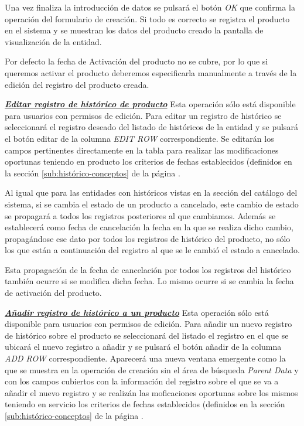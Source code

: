 Una vez finaliza la introducción de datos se pulsará el botón \emph{OK} que confirma la operación del formulario de creación. Si todo es correcto se registra el producto en el sistema y se muestran los datos del producto creado la pantalla de visualización de la entidad.

Por defecto la fecha de Activación del producto no se cubre, por lo que si queremos activar el producto deberemos especificarla manualmente a través de la edición del registro del producto creada.


\underline{\textsl{\textbf{Editar registro de histórico de producto}}}\newline
Esta operación sólo está disponible para usuarios con permisos de edición.
Para editar un registro de histórico se seleccionará el registro deseado del listado de históricos de la entidad y se pulsará el botón editar de la columna \textit{EDIT ROW} correspondiente. Se editarán los campos pertinentes directamente en la tabla para realizar las modificaciones oportunas teniendo en producto los criterios de fechas establecidos (definidos en la sección \ref{sub:histórico-conceptos} de la página \pageref{sub:histórico-conceptos}.

Al igual que para las entidades con históricos vistas en la sección del catálogo del sistema, si se cambia el estado de un producto a cancelado, este cambio de estado se propagará a todos los registros posteriores al que cambiamos. Además se establecerá como fecha de cancelación la fecha en la que se realiza dicho cambio, propagándose ese dato por todos los registros de histórico del producto, no sólo los que están a continuación del registro al que se le cambió el estado a cancelado.

Esta propagación de la fecha de cancelación por todos los registros del histórico  también ocurre si se modifica dicha fecha. Lo mismo ocurre si se cambia la fecha de activación del producto.

\underline{\textsl{\textbf{Añadir registro de histórico a un producto}}}\newline
Esta operación sólo está disponible para usuarios con permisos de edición.
Para añadir un nuevo registro de histórico sobre el producto se seleccionará del listado el registro en el que se ubicará el nuevo registro a añadir y se pulsará el botón añadir de la columna \textit{ADD ROW} correspondiente. Aparecerá una nueva ventana emergente como la que se muestra en la operación de creación sin el área de búsqueda \emph{Parent Data} y con los campos cubiertos con la información del registro sobre el que se va a añadir el nuevo registro y se realizán las moficaciones oportunas sobre los mismos teniendo en servicio los criterios de fechas establecidos (definidos en la sección \ref{sub:histórico-conceptos} de la página \pageref{sub:histórico-conceptos}.

